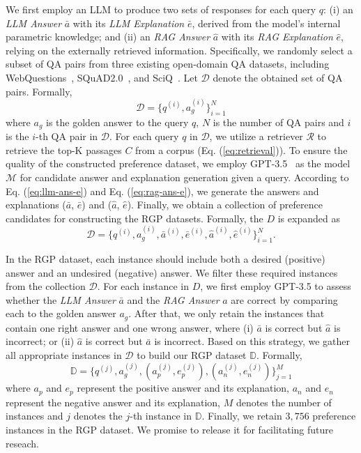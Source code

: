 We first employ an LLM to produce two sets of responses for each query $q$: (i) an \emph{LLM Answer} $\bar{a}$ with its \emph{LLM Explanation} $\bar{e}$, derived from the model’s internal parametric knowledge; and (ii) an \emph{RAG Answer} $\hat{a}$ with its \emph{RAG Explanation} $\hat{e}$, relying on the externally retrieved information.
Specifically, we randomly select a subset of QA pairs from three existing open-domain QA datasets, including WebQuestions~\cite{berant2013webq}, SQuAD2.0~\cite{rajpurkar2018squad}, and SciQ~\cite{welbl2017sciq}.
Let $\mathcal{D}$ denote the obtained set of QA pairs. Formally,
\begin{equation} \label{eq:gold}
    \mathcal{D} = \bigl\{q^{(i)}, a_g^{(i)}\bigr\}_{i=1}^N
\end{equation}
where $a_g$ is the golden answer to the query $q$, $N$ is the number of QA pairs and  $i$ is the $i$-th QA pair in $\mathcal{D}$.
For each query $q$ in $\mathcal{D}$, we utilize a retriever $\mathcal{R}$ to retrieve the top-K passages $C$ from a corpus (Eq. (\ref{eq:retrieval})).
To ensure the quality of the constructed preference dataset, we employ GPT-3.5~\cite{Ouyang2022Training} as the model $\mathcal{M}$ for candidate answer and explanation generation given a query.
According to Eq. (\ref{eq:llm-ans-e}) and Eq. (\ref{eq:rag-ans-e}), we generate the answers and explanations ($\bar{a}$, $\bar{e}$) and ($\hat{a}$, $\hat{e}$). 
Finally, we obtain a collection of preference candidates for constructing the RGP datasets.
Formally, the $D$ is expanded as
\begin{equation} \label{eq:gold}
    \mathcal{D} = \bigl\{q^{(i)}, a_g^{(i)}, \bar{a}^{(i)},\bar{e}^{(i)}, \hat{a}^{(i)}, \hat{e}^{(i)}\bigr\}_{i=1}^N.
\end{equation}

In the RGP dataset, each instance should include both a desired (positive) answer and an undesired (negative) answer.
We filter these required instances from the collection $\mathcal{D}$.
For each instance in $D$, we first employ GPT-3.5 to assess whether the \emph{LLM Answer} $\bar{a}$ and the \emph{RAG Answer} $\hat{a}$ are correct by comparing each to the golden answer $a_g$.
After that, we only retain the instances that contain one right answer and one wrong answer, where (i) $\bar{a}$ is correct but $\hat{a}$ is incorrect; or (ii) $\hat{a}$ is correct but $\bar{a}$ is incorrect.
Based on this strategy, we gather all appropriate instances in $\mathcal{D}$ to build our RGP dataset $\mathbb{D}$. Formally,
\begin{equation} \label{eq:gold}
    \mathbb{D} = \bigl\{q^{(j)}, a_g^{(j)}, (a_p^{(j)}, e_p^{(j)}), (a_n^{(j)}, e_n^{(j)})\bigr\}_{j=1}^M
\end{equation}
where $a_p$ and $e_p$ represent the positive answer and its explanation, $a_n$ and $e_n$ represent the negative answer and its explanation, $M$ denotes the number of instances and $j$ denotes the $j$-th instance in $\mathbb{D}$.
Finally, we retain $3,756$ preference instances in the RGP dataset.
We promise to release it for facilitating future reseach.


